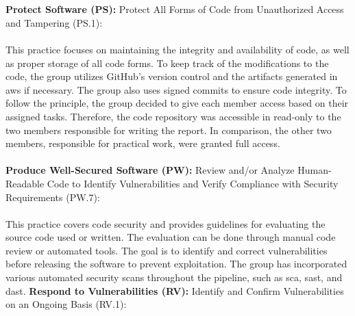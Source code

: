 \\~\\        
\textbf{Protect Software (PS):}
Protect All Forms of Code from Unauthorized
Access and Tampering (PS.1): \textit{}\cite{ssdf}
\\~\\
This practice focuses on maintaining the integrity and availability of code, as well as proper storage of all code forms. To keep track of the modifications to the code, the group utilizes GitHub's version control and the artifacts generated in \acrshort{aws} if necessary. The group also uses signed commits to ensure code integrity. To follow the  principle, the group decided to give each member access based on their assigned tasks. Therefore, the code repository was accessible in read-only to the two members responsible for writing the report. In comparison, the other two members, responsible for practical work, were granted full access. 
\\~\\
\textbf{Produce Well-Secured Software (PW):} Review and/or Analyze Human-Readable
Code to Identify Vulnerabilities and Verify Compliance with Security Requirements (PW.7): \textit{}\cite{ssdf}
\\~\\
This practice covers code security and provides guidelines for evaluating the source code used or written. The evaluation can be done through manual code review or automated tools. The goal is to identify and correct vulnerabilities before releasing the software to prevent exploitation. The group has incorporated various automated security scans throughout the pipeline, such as \acrshort{sca}, \acrshort{sast}, and \acrshort{dast}. 
\newpage
\textbf{Respond to Vulnerabilities (RV):}
Identify and Confirm Vulnerabilities on an Ongoing Basis (RV.1): \textit{}\cite{ssdf}
